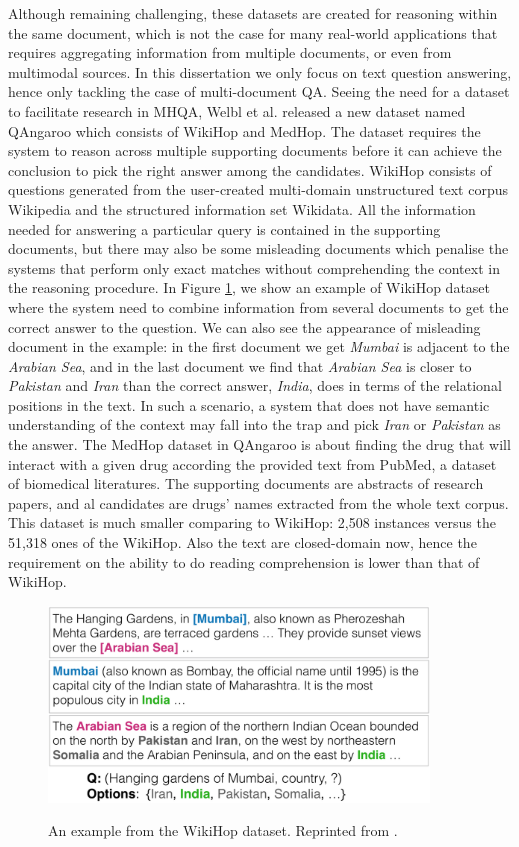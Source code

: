 \documentclass{report}
\begin{document}
Although remaining challenging, these datasets are created for reasoning within the same document, which is not the case for many real-world applications that requires aggregating information from multiple documents, or even from multimodal sources. In this dissertation we only focus on text question answering, hence only tackling the case of multi-document QA. Seeing the need for a dataset to facilitate research in MHQA, Welbl et al. released a new dataset named QAngaroo \cite{welbl_constructing_2018} which consists of WikiHop and MedHop. The dataset requires the system to reason across multiple supporting documents before it can achieve the conclusion to pick the right answer among the candidates. WikiHop consists of questions generated from the user-created multi-domain unstructured text corpus Wikipedia and the structured information set Wikidata. All the information needed for answering a particular query is contained in the supporting documents, but there may also be some misleading documents which penalise the systems that perform only exact matches without comprehending the context in the reasoning procedure. In Figure \ref{wikihop_example}, we show an example of WikiHop dataset where the system need to combine information from several documents to get the correct answer to the question. We can also see the appearance of misleading document in the example: in the first document we get \textit{Mumbai} is adjacent to the \textit{Arabian Sea}, and in the last document we find that \textit{Arabian Sea} is closer to \textit{Pakistan} and \textit{Iran} than the correct answer, \textit{India}, does in terms of the relational positions in the text. In such a scenario, a system that does not have semantic understanding of the context may fall into the trap and pick \textit{Iran} or \textit{Pakistan} as the answer. The MedHop dataset in QAngaroo is about finding the drug that will interact with a given drug according the provided text from PubMed, a dataset of biomedical literatures. The supporting documents are abstracts of research papers, and al candidates are drugs' names extracted from the whole text corpus. This dataset is much smaller comparing to WikiHop: 2,508 instances versus the 51,318 ones of the WikiHop. Also the text are closed-domain now, hence the requirement on the ability to do reading comprehension is lower than that of WikiHop. 
\begin{figure}
\centering
\includegraphics[width=0.9\textwidth]{figures/wikihop_example.png}
\label{wikihop_example}
\caption[An example from the WikiHop dataset.]{An example from the WikiHop dataset. Reprinted from \cite{welbl_constructing_2018}.}
\end{figure}
\end{document}
